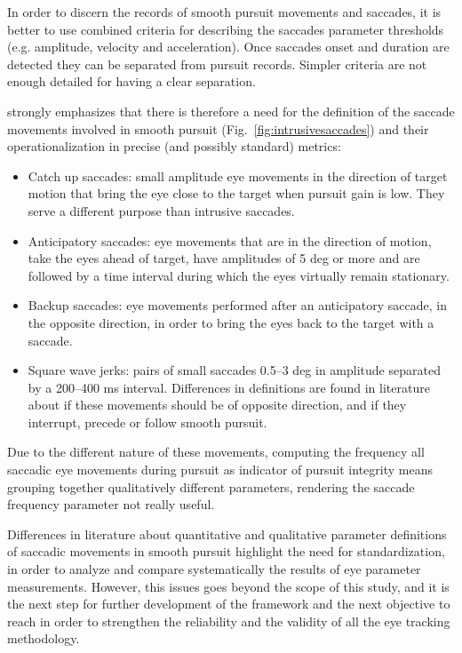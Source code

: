 In order to discern the records of smooth pursuit movements and saccades, it is better to use combined criteria for describing the saccades parameter thresholds (e.g. amplitude, velocity and acceleration). Once saccades onset and duration are detected they can be separated from pursuit records. Simpler criteria are not enough detailed for having a clear separation. 

\cite{smyrnis2008guidelines} strongly emphasizes that there is therefore a need for the definition of the saccade movements involved in smooth pursuit (Fig.~\ref{fig:intrusivesaccades}) and their operationalization in precise (and possibly standard) metrics:
\begin{itemize}
    \item Catch up saccades: small amplitude eye movements in the direction of target motion that bring the eye close to the target when pursuit gain is low. They serve a different purpose than intrusive saccades.
    \item Anticipatory saccades: eye movements that are in the direction of motion, take the eyes ahead of target, have amplitudes of 5 deg or more and are followed by a time interval during which the eyes virtually remain stationary.
    \item Backup saccades: eye movements performed after an anticipatory saccade, in the opposite direction, in order to bring the eyes back to the target with a saccade.
    \item Square wave jerks: pairs of small saccades 0.5–3 deg in amplitude separated by a 200–400 ms interval. Differences in definitions are found in literature about if these movements should be of opposite direction, and if they interrupt, precede or follow smooth pursuit.
\end{itemize}

Due to the different nature of these movements, computing the frequency all saccadic eye movements during pursuit as indicator of pursuit integrity means grouping together qualitatively different parameters, rendering the saccade frequency parameter not really useful. 

Differences in literature about quantitative and qualitative parameter definitions of saccadic movements in smooth pursuit highlight the need for standardization, in order to analyze and compare systematically the results of eye parameter measurements. However, this issues goes beyond the scope of this study, and it is the next step for further development of the framework and the next objective to reach in order to strengthen the reliability and the validity of all the eye tracking methodology.

